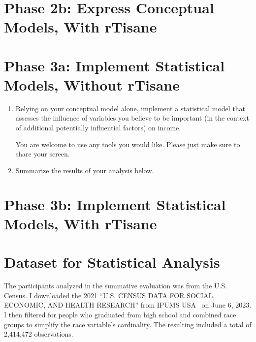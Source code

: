 \section{Phase 2b: Express Conceptual Models, With rTisane}
\clearpage

\section{Phase 3a: Implement Statistical Models, Without rTisane}
\begin{enumerate}
    \item Relying on your conceptual model alone, implement a statistical model that
    assesses the influence of variables you believe to be important (in the context
    of additional potentially influential factors) on income.

    You are welcome to use any tools you would like. Please just make sure to share
    your screen. 

    \item Summarize the results of your analysis below.
\end{enumerate}
\clearpage

\section{Phase 3b: Implement Statistical Models, With rTisane}
\clearpage

\section{Dataset for Statistical Analysis}
The \dataSet participants analyzed in the summative evaluation was from the U.S.
Census. I downloaded the 2021 ``U.S. CENSUS DATA FOR SOCIAL, ECONOMIC, AND
HEALTH RESEARCH'' from IPUMS USA~\cite{ruggles2020ipums} on June 6, 2023. I then filtered for
people who graduated from high school and combined race groups to
simplify the race variable's cardinality. The resulting \dataSet included a
total of 2,414,472 observations. 
